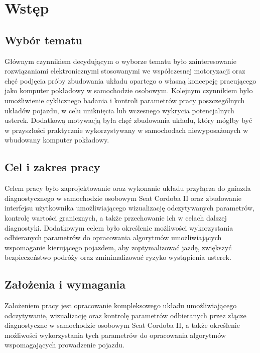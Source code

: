 \documentclass[12pt, twoside]{article} %
\numberwithin{equation}{subsection}
\numberwithin{figure}{section}
\numberwithin{table}{section}
\begin{document}
\section{Wstęp}

	\subsection{Wybór tematu}
		\hspace{0.5cm}Głównym czynnikiem decydującym o wyborze tematu było zainteresowanie rozwiązaniami elektronicznymi stosowanymi we współczesnej motoryzacji oraz chęć podjęcia próby zbudowania układu opartego o własną koncepcję pracującego jako komputer pokładowy w samochodzie osobowym. Kolejnym czynnikiem było umożliwienie cyklicznego badania i kontroli parametrów pracy poszczególnych układów pojazdu, w celu uniknięcia lub wczesnego wykrycia potencjalnych usterek. Dodatkową motywacją była chęć zbudowania układu, który mógłby być w przyszłości praktycznie wykorzystywany w samochodach niewyposażonych w wbudowany komputer pokładowy. 	
	
	\subsection{Cel i zakres pracy}
		\hspace{0.5cm}Celem pracy było zaprojektowanie oraz wykonanie układu przyłącza do gniazda diagnostycznego w samochodzie osobowym Seat Cordoba II oraz zbudowanie interfejsu użytkownika umożliwiającego wizualizację odczytywanych parametrów, kontrolę wartości granicznych, a także przechowanie ich w celach dalszej diagnostyki. Dodatkowym celem było określenie możliwości wykorzystania odbieranych parametrów do opracowania algorytmów umożliwiających wspomaganie kierującego pojazdem, aby zoptymalizować jazdę, zwiększyć bezpieczeństwo podróży oraz zminimalizować ryzyko wystąpienia usterek. 
	
	\subsection{Założenia i wymagania}
		\hspace{0.5cm}Założeniem pracy jest opracowanie kompleksowego układu umożliwiającego odczytywanie, wizualizację oraz kontrolę parametrów odbieranych przez złącze diagnostyczne w samochodzie osobowym Seat Cordoba II, a także określenie możliwości wykorzystania tych parametrów do opracowania algorytmów wspomagających prowadzenie pojazdu.
	
\end{document}
